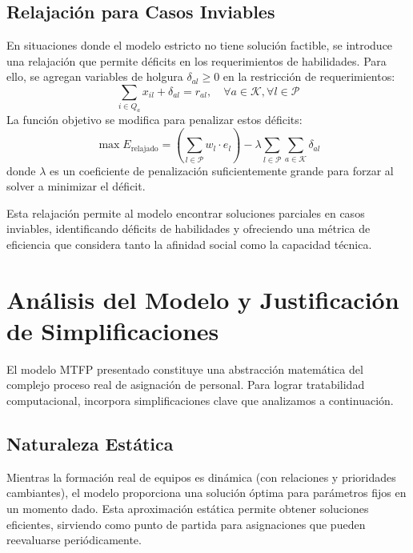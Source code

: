 \documentclass[conference]{IEEEtran}
\begin{document}
\subsection{Relajación para Casos Inviables}
\label{sec:relaxation_infeasible}

En situaciones donde el modelo estricto no tiene solución factible, se introduce una relajación que permite déficits en los requerimientos de habilidades. Para ello, se agregan variables de holgura \(\delta_{al} \geq 0\) en la restricción de requerimientos:
\begin{equation}
    \sum_{i \in Q_a} x_{il} + \delta_{al} = r_{al}, \quad \forall a \in \mathcal{K}, \forall l \in \mathcal{P}
    \label{eq:constraint_skills_relaxed}
\end{equation}
La función objetivo se modifica para penalizar estos déficits:
\begin{equation}
    \max E_{\text{relajado}} = \left( \sum_{l \in \mathcal{P}} w_l \cdot e_l \right) - \lambda \sum_{l \in \mathcal{P}} \sum_{a \in \mathcal{K}} \delta_{al}
    \label{eq:objective_total_relaxed}
\end{equation}
donde \(\lambda\) es un coeficiente de penalización suficientemente grande para forzar al solver a minimizar el déficit.

Esta relajación permite al modelo encontrar soluciones parciales en casos inviables, identificando déficits de habilidades y ofreciendo una métrica de eficiencia que considera tanto la afinidad social como la capacidad técnica.

\section{Análisis del Modelo y Justificación de Simplificaciones}

El modelo MTFP presentado constituye una abstracción matemática del complejo proceso real de asignación de personal. Para lograr tratabilidad computacional, incorpora simplificaciones clave que analizamos a continuación.

\subsection{Naturaleza Estática}
Mientras la formación real de equipos es dinámica (con relaciones y prioridades cambiantes), el modelo proporciona una solución óptima para parámetros fijos en un momento dado. Esta aproximación estática permite obtener soluciones eficientes, sirviendo como punto de partida para asignaciones que pueden reevaluarse periódicamente.
\end{document}
